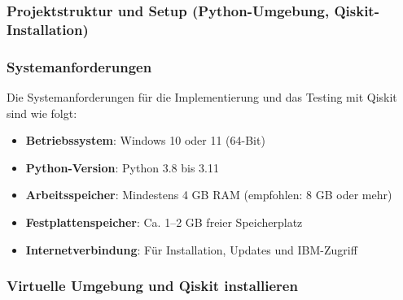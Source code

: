 \subsubsection{Projektstruktur und Setup (Python-Umgebung, Qiskit-Installation)}

\setlength{\parindent}{0pt} %
\setlength{\parskip}{1em}   %

\subsubsection*{Systemanforderungen}
Die Systemanforderungen für die Implementierung und das Testing mit Qiskit sind wie folgt:
\begin{itemize}
    \item \textbf{Betriebssystem}: Windows 10 oder 11 (64-Bit)
    \item \textbf{Python-Version}: Python 3.8 bis 3.11
    \item \textbf{Arbeitsspeicher}: Mindestens 4 GB RAM (empfohlen: 8 GB oder mehr)
    \item \textbf{Festplattenspeicher}: Ca. 1--2 GB freier Speicherplatz
    \item \textbf{Internetverbindung}: Für Installation, Updates und IBM-Zugriff
\end{itemize}

\subsubsection*{Virtuelle Umgebung und Qiskit installieren}

